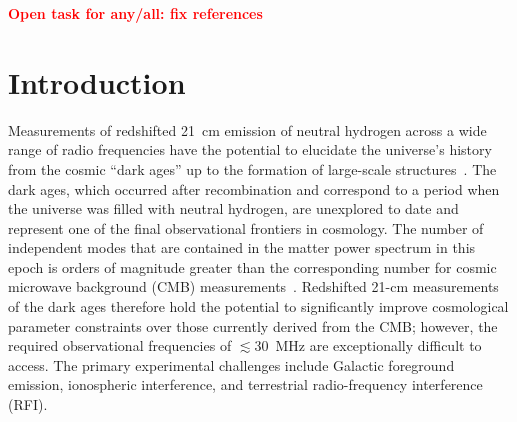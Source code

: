 \documentclass{ws-jai}
\newcommand{\attention}[1]{\textcolor{red}{\bf {#1}}}
\begin{document}

\attention{Open task for any/all: fix references}

\section{Introduction}

Measurements of redshifted \SI{21}{\cm} emission of neutral hydrogen
across a wide range of radio frequencies have the potential to
elucidate the universe's history from the cosmic ``dark ages'' up to
the formation of large-scale
structures~\citep{2020PASA...37....2W,2013PhRvD..87d3002L,2014ApJ...782...66P}.
The dark ages, which occurred after recombination and correspond to a
period when the universe was filled with neutral hydrogen, are
unexplored to date and represent one of the final observational
frontiers in cosmology.  The number of independent modes that are
contained in the matter power spectrum in this epoch is orders of
magnitude greater than the corresponding number for cosmic microwave
background (CMB) measurements~\citep{2004PhRvL..92u1301L}.  Redshifted
21-cm measurements of the dark ages therefore hold the potential to
significantly improve cosmological parameter constraints over those
currently derived from the CMB; however, the required observational
frequencies of $\lesssim 30$~MHz are exceptionally difficult to
access.  The primary experimental challenges include Galactic
foreground emission, ionospheric interference, and terrestrial
radio-frequency interference (RFI).
\end{document}
